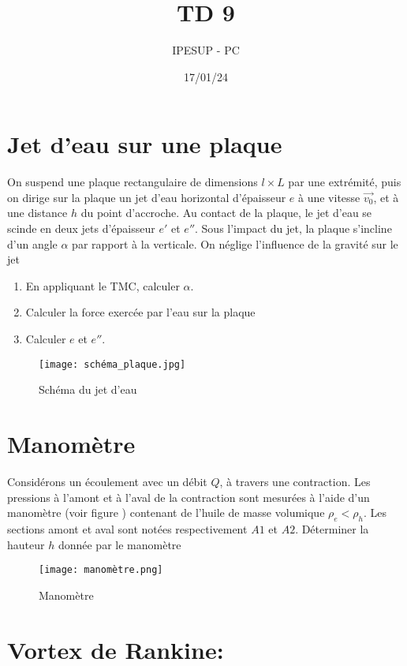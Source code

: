 \documentclass{article}
\title{TD 9}
\author{IPESUP - PC }
\date{17/01/24}
\begin{document}
\maketitle



\section{Jet d'eau sur une plaque}

On suspend une plaque rectangulaire de dimensions $l \times L$ par une extrémité, puis on dirige sur la plaque un jet d'eau horizontal d'épaisseur $e$ à une vitesse $\vec{v_0}$, et à une distance $h$ du point d'accroche.
Au contact de la plaque, le jet d'eau se scinde en deux jets d'épaisseur $e'$ et $e''$. 
Sous l'impact du jet, la plaque s'incline d'un angle $\alpha$ par rapport à la verticale.
On néglige l'influence de la gravité sur le jet

\begin{enumerate}
  \item En appliquant le TMC, calculer $\alpha$.
  \item Calculer la force exercée par l'eau sur la plaque
  \item Calculer $e$ et $e''$. 
\end{enumerate}

\begin{figure}[h]
  \centering
  \texttt{[image: schéma\_plaque.jpg]}
  \caption{Schéma du jet d'eau}
  \label{fig:jet}
\end{figure}
\section{Manomètre}

Considérons un écoulement avec un débit $Q$, à travers une contraction. Les pressions
à l’amont et à l’aval de la contraction sont mesurées à l’aide d’un manomètre (voir figure
) contenant de l’huile de masse volumique $\rho_e < \rho_h $. Les sections amont et aval
sont notées respectivement $A1$ et $A2$. Déterminer la hauteur $h$ donnée par le manomètre

\begin{figure}[h]
  \centering
  \texttt{[image: manomètre.png]}
  \caption{Manomètre}
  \label{fig:manometre}


\end{figure}
\newpage

\section{Vortex de Rankine:}
\end{document}
